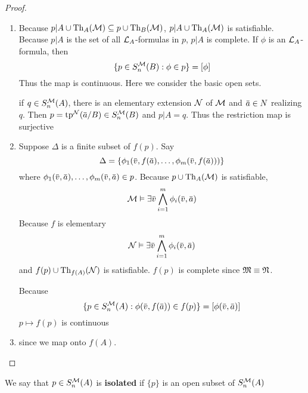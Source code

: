 \documentclass[11pt]{article}
\begin{document}
\begin{proof}
\begin{enumerate}
\item Because \(p|A\cup\operatorname{Th}_A(\mathcal{M})\subseteq p\cup\operatorname{Th}_B(\mathcal{M})\), \(p|A\cup\operatorname{Th}_A(\mathcal{M})\) is satisfiable.  Because \(p|A\) is
the set of all \(\mathcal{L}_A\)-formulas in \(p\), \(p|A\) is complete. If \(\phi\) is an \(\mathcal{L}_A\)-formula,
then
\begin{equation*}
\{p\in S_n^{\mathcal{M}}(B):\phi\in p\}=[\phi]
\end{equation*}
Thus the map is continuous. Here we consider the basic open sets.

if \(q\in S_n^{\mathcal{M}}(A)\), there is an elementary extension \(\mathcal{N}\) of \(\mathcal{M}\) and \(\bara\in N\)
realizing \(q\). Then \(p=\tp^{\caln}(\bara/B)\in S_n^{\calm}(B)\) and \(p|A=q\). Thus the restriction
map is surjective

\item Suppose \(\Delta\) is a finite subset of \(f(p)\). Say
\begin{equation*}
\Delta=\{\phi_1(\barv,f(\bara),\dots,\phi_m(\barv,f(\bara)))\}
\end{equation*}
where \(\phi_1(\barv,\bara),\dots,\phi_m(\barv,\bara)\in p\). Because \(p\cup\operatorname{Th}_A(\mathcal{M})\) is satisfiable,
\begin{equation*}
\calm\vDash\exists\barv\bigwedge_{i=1}^m\phi_i(\barv,\bara)
\end{equation*}
Because \(f\) is elementary
\begin{equation*}
\caln\vDash\exists\barv\bigwedge_{i=1}^m\phi_i(\barv,\bara)
\end{equation*}
and \(f(p)\cup\operatorname{Th}_{f(A)}(\mathcal{N})\) is satisfiable. \(f(p)\) is complete since \(\mathfrak{M}\equiv\mathfrak{N}\).

Because
\begin{equation*}
\{p\in S_n^{\calm}(A):\phi(\barv,f(\bara))\in f(p)\}=[\phi(\barv,\bara)]
\end{equation*}
\(p\mapsto f(p)\) is continuous

\item since we map onto \(f(A)\).
\end{enumerate}
\end{proof}

\begin{definition}[]
We say that \(p\in S_n^{\mathcal{M}}(A)\) is \textbf{isolated} if \(\{p\}\) is an open subset of \(S_n^{\mathcal{M}}(A)\)
\end{definition}
\end{document}
